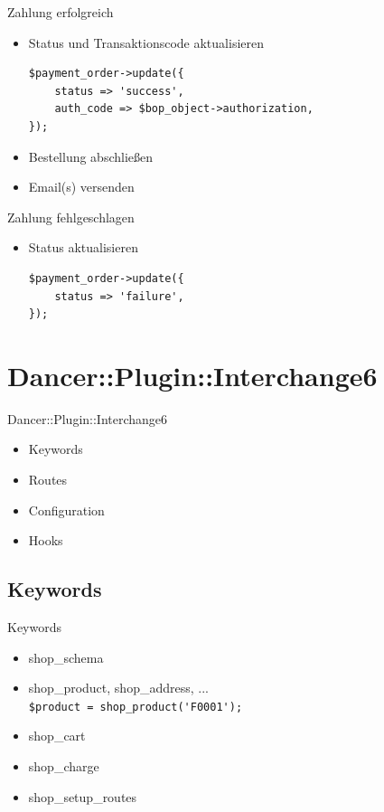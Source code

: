 \begin{frame}[fragile]{Zahlung erfolgreich}
\begin{itemize}
\item Status und Transaktionscode aktualisieren
\begin{lstlisting}
$payment_order->update({
    status => 'success',
    auth_code => $bop_object->authorization,
});
\end{lstlisting}
\item Bestellung abschließen
\item Email(s) versenden
\end{itemize}
\end{frame}

\begin{frame}[fragile]{Zahlung fehlgeschlagen}
\begin{itemize}
\item Status aktualisieren
\begin{lstlisting}
$payment_order->update({
    status => 'failure',
});
\end{lstlisting}
\end{itemize}
\end{frame}

\section{Dancer::Plugin::Interchange6}
\begin{frame}{Dancer::Plugin::Interchange6}
\begin{itemize}
\item Keywords
\item Routes
\item Configuration
\item Hooks
\end{itemize}
\end{frame}

\subsection{Keywords}
\begin{frame}[fragile]{Keywords}
\begin{itemize}
\item shop\_schema
\item shop\_product, shop\_address, ...\\
\verb|$product = shop_product('F0001');|
\item shop\_cart
\item shop\_charge
\item shop\_setup\_routes
\end{itemize}
\end{frame}

